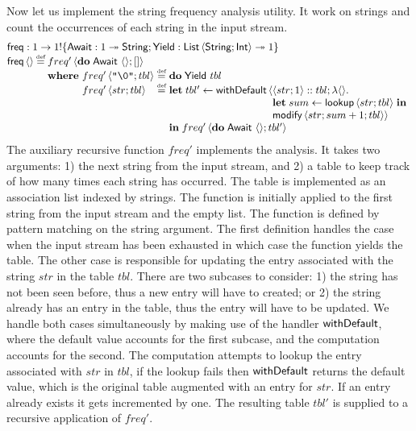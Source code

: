 \documentclass[12pt,phd,lfcs,twoside,openright,logo,leftchapter,normalheadings]{infthesis}
\theoremstyle{plain}
\theoremstyle{definition}
\begin{document}
Now let us implement the string frequency analysis utility. It work on
strings and count the occurrences of each string in the input stream.
%
\[
  \bl
    \freq : \UnitType \to \UnitType \eff \{\Await : \UnitType \opto \String;\Yield : \List\,\Record{\String;\Int} \opto \UnitType\}\\
    \freq\,\Unit \defas
      \bl
        freq'\,\Record{\Do\;\Await~\Unit;\nil}\\
        \where
          \ba[t]{@{~}l@{~}c@{~}l}
            freq'\,\Record{\strlit{\textnil};tbl} &\defas& \Do\;\Yield~tbl\\
            freq'\,\Record{str;tbl} &\defas&
              \bl
                \Let\;tbl' \revto \faild\,\Record{
                \bl
                  \Record{str;1} \cons tbl; \lambda\Unit.\\
                  \Let\; sum \revto \lookup\,\Record{str;tbl}\;\In\\
                  \modify\,\Record{str;sum+1;tbl}}
                \el\\
                \In\;freq'\,\Record{\Do\;\Await~\Unit;tbl'}
              \el
          \ea
      \el
  \el
\]
%
The auxiliary recursive function $freq'$ implements the analysis. It
takes two arguments: 1) the next string from the input stream, and 2)
a table to keep track of how many times each string has occurred. The
table is implemented as an association list indexed by strings. The
function is initially applied to the first string from the input
stream and the empty list. The function is defined by pattern matching
on the string argument. The first definition handles the case when the
input stream has been exhausted in which case the function yields the
table. The other case is responsible for updating the entry associated
with the string $str$ in the table $tbl$. There are two subcases to
consider: 1) the string has not been seen before, thus a new entry
will have to created; or 2) the string already has an entry in the
table, thus the entry will have to be updated. We handle both cases
simultaneously by making use of the handler $\mathsf{withDefault}$, where the
default value accounts for the first subcase, and the computation
accounts for the second. The computation attempts to lookup the entry
associated with $str$ in $tbl$, if the lookup fails then $\mathsf{withDefault}$
returns the default value, which is the original table augmented with
an entry for $str$. If an entry already exists it gets incremented by
one. The resulting table $tbl'$ is supplied to a recursive application
of $freq'$.
\end{document}
